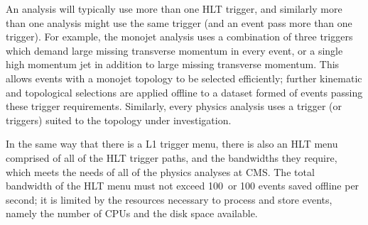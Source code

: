 An analysis will typically use more than one \ac{HLT} trigger, and similarly more than one analysis might use the same trigger (and an event pass more than one trigger).
For example, the monojet analysis %
uses a combination of three triggers which demand large missing transverse momentum in every event, or a single high momentum jet in addition to large missing transverse momentum.
This allows events with a monojet topology to be selected efficiently; further kinematic and topological selections are applied offline to a dataset formed of events passing these trigger requirements.
Similarly, every physics analysis uses a trigger (or triggers) suited to the topology under investigation.


In the same way that there is a \ac{L1} trigger menu, there is also an \ac{HLT} menu 
comprised of all of the \ac{HLT} trigger paths, and the bandwidths they require, which meets the needs of all of the physics analyses at \ac{CMS}.
The total bandwidth of the \ac{HLT} menu must not exceed 100~\Hz or 100 events saved offline per second; it is limited by the resources necessary to process and store events, namely the number of \ac{CPU}s and the disk space available.

\clearpage
